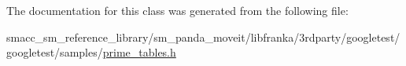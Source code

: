 The documentation for this class was generated from the following file\+:\begin{DoxyCompactItemize}
\item 
smacc\+\_\+sm\+\_\+reference\+\_\+library/sm\+\_\+panda\+\_\+moveit/libfranka/3rdparty/googletest/googletest/samples/\hyperlink{prime__tables_8h}{prime\+\_\+tables.\+h}\end{DoxyCompactItemize}
